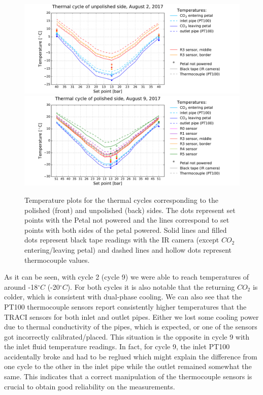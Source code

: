 		\begin{figure}[ht!]
			\centering
			\captionsetup{justification=centering,margin=0cm}
			\includegraphics[scale=0.45]{Figures/Chapter04/unwrapped_cycle_2_201711121522.pdf}
			\includegraphics[scale=0.45]{Figures/Chapter04/unwrapped_cycle_9_201711121522.pdf}
			\caption{Temperature plots for the thermal cycles corresponding to the polished (front) and unpolished (back) sides. The dots represent set points with the Petal not powered and the lines correspond to set points with both sides of the petal powered. Solid lines and filled dots represent black tape readings with the IR camera (except $CO_{2}$ entering/leaving petal) and dashed lines and hollow dots represent thermocouple values.}\label{fig4.1}
		\end{figure}
	
		As it can be seen, with cycle 2 (cycle 9) we were able to reach temperatures of around -18\space$^\circ C$ (-20\space$^\circ C$). For both cycles it is also notable that the returning $CO_{2}$ is colder, which is consistent with dual-phase cooling. We can also see that the PT100 thermocouple sensors report consistently higher temperatures that the TRACI sensors for both inlet and outlet pipes. Either we lost some cooling power due to thermal conductivity of the pipes, which is expected, or one of the sensors got incorrectly calibrated/placed. This situation is the opposite in cycle 9 with the inlet fluid temperature readings. In fact, for cycle 9, the inlet PT100 accidentally broke and had to be reglued which might explain the difference from one cycle to the other in the inlet pipe while the outlet remained somewhat the same. This indicates that a correct manipulation of the thermocouple sensors is crucial to obtain good reliability on the measurements.
		
